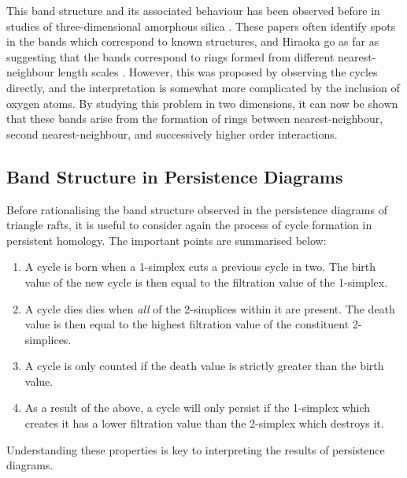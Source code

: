 This band structure and its associated behaviour has been observed before in studies of three\--dimensional amorphous silica \cite{Nakamura2015,Hiraoka2016,Robins2017}.
These papers often identify spots in the bands which correspond to known structures, and Hiraoka \etal{} go as far as suggesting that the bands correspond to rings formed from different nearest\--neighbour length scales \cite{Hiraoka2016}.
However, this was proposed by observing the cycles directly, and the interpretation is somewhat more complicated by the inclusion of oxygen atoms.
By studying this problem in two dimensions, it can now be shown that these bands arise from the formation of rings between nearest\--neighbour, second nearest\--neighbour, and successively higher order interactions.


\subsection{Band Structure in Persistence Diagrams}
\label{s:phbands}

Before rationalising the band structure observed in the persistence diagrams of triangle rafts, it is useful to consider again the process of cycle formation in persistent homology.
The important points are summarised below:
\begin{enumerate}
	\item A cycle is born when a 1\--simplex cuts a previous cycle in two. The birth value of the new cycle is then equal to the filtration value of the 1\--simplex.
	\item A cycle dies dies when \textit{all} of the 2\--simplices within it are present. The death value is then equal to the highest filtration value of the  constituent 2\--simplices.
	\item A cycle is only counted if the death value is strictly greater than the birth value.
	\item As a result of the above, a cycle will only persist if the 1\--simplex which creates it has a lower filtration value than the 2\--simplex which destroys it.
\end{enumerate}
Understanding these properties is key to interpreting the results of persistence diagrams.

